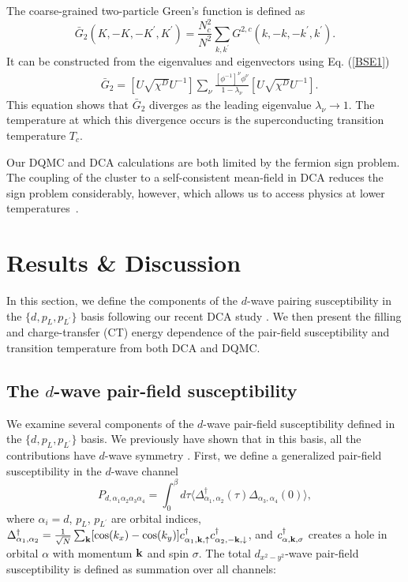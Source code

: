 \documentclass[reprint,nofootinbib,nobibnotes,amsmath,amssymb,aps,prb,floatfix]{revtex4-2}
\newcommand{\pdag}{{\phantom\dagger}}
\newcommand{\beq}{\begin{equation}}
\newcommand{\eeq}{\end{equation}}
\newcommand{\disp}[1]{Eq. (\ref{#1})}
\begin{document}
The coarse-grained two-particle Green's 
function is defined as 
\beq
\bar{G}_2(K,-K,-K^\prime,K^\prime) = \frac{N_c^2}{N^2}\sum_{k,k^\prime}G^{2,c}(k,-k,-k^\prime,k^\prime).
\label{cgG2}
\eeq
It can be constructed from the eigenvalues and eigenvectors using \disp{BSE1}
\beq
\begin{split}
&\bar{G}_{2}=
[U\sqrt{\chi^D}U^{-1}]\sum_{\nu}\frac{[\phi^{-1}]^{\nu}\phi^{\nu}}{1-\lambda_{\nu}}[U\sqrt{\chi^D}U^{-1}].\label{G2r}
\end{split}
\eeq
This equation shows that $\bar{G}_2$ diverges as the leading eigenvalue $\lambda_{\nu}\rightarrow 1$. The temperature at which this divergence occurs 
is the superconducting transition temperature $T_c$.  

Our DQMC and DCA calculations are both limited by the fermion sign problem. The coupling of the cluster to a self-consistent mean-field in DCA reduces the sign problem considerably, however, which allows us to access physics at lower temperatures~\cite{Maier1, Jarrell}.

\section{Results \& Discussion}
In this section, we define the components of the $d$-wave pairing susceptibility in the  $\{d,p_L,p_{L^\prime}\}$ basis following our recent DCA study \cite{Mai}. We then present the filling and charge-transfer (CT) energy dependence of the pair-field susceptibility and transition temperature from both DCA and DQMC. 

\subsection{The $d$-wave pair-field susceptibility}
We examine several components of the $d$-wave pair-field susceptibility defined in the $\{d,p_L,p_{L^\prime}\}$ basis. We previously have shown that in this basis, all the contributions have $d$-wave symmetry \cite{Mai}. 
First, we define a generalized pair-field susceptibility in the $d$-wave channel 
\beq
P_{d,\alpha_1\alpha_2\alpha_3\alpha_4}=\int_0^{\beta} d\tau\langle \Delta^{\dagger}_{\alpha_1,\alpha_2}(\tau) \Delta^\pdag_{\alpha_3,\alpha_4}(0) \rangle,
\eeq
where $\alpha_i=d$, $p_L$, $p_{L^\prime}$ are orbital indices,  $\Delta^{\dagger}_{\alpha_1,\alpha_2}=\frac{1}{\sqrt{N}}\sum_{\bf k}[\cos(k_x)-\cos(k_y)]c^{\dagger}_{\alpha_1,\bf{k},\uparrow}c^{\dagger}_{\alpha_2,-\bf{k},\downarrow}$, and $c^{\dagger}_{\alpha,\bf{k},\sigma}$ creates a hole in orbital $\alpha$ with momentum ${\bf k}$ and spin $\sigma$.
The total $d_{x^2-y^2}$-wave pair-field susceptibility is defined as summation over all channels:
\end{document}
